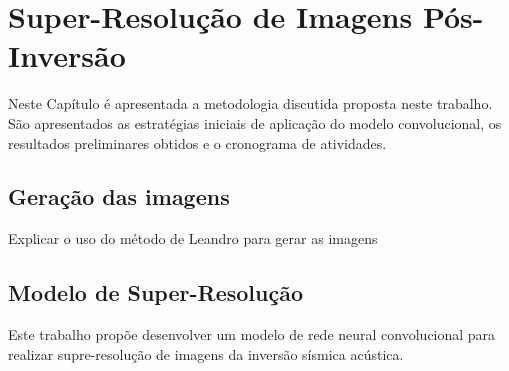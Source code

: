 \chapter{Super-Resolução de Imagens Pós-Inversão}
\label{cap:3modeloHibrido}

Neste Capítulo é apresentada a metodologia discutida proposta neste trabalho.
São apresentados as estratégias iniciais de aplicação do modelo convolucional,
os resultados preliminares obtidos e o cronograma de atividades.

\section{Geração das imagens}
Explicar o uso do método de Leandro para gerar as imagens

\section{Modelo de Super-Resolução}

Este trabalho propõe desenvolver um modelo de rede neural convolucional para
realizar supre-resolução de imagens da inversão sísmica acústica.

